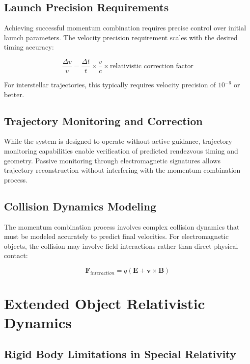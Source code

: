 \documentclass[11pt,a4paper]{article}
\theoremstyle{remark}
\begin{document}
\subsection{Launch Precision Requirements}

Achieving successful momentum combination requires precise control over initial launch parameters. The velocity precision requirement scales with the desired timing accuracy:

\begin{equation}
\frac{\Delta v}{v} = \frac{\Delta t}{t} \times \frac{v}{c} \times \text{relativistic correction factor}
\label{eq:precision_requirement}
\end{equation}

For interstellar trajectories, this typically requires velocity precision of $10^{-6}$ or better.

\subsection{Trajectory Monitoring and Correction}

While the system is designed to operate without active guidance, trajectory monitoring capabilities enable verification of predicted rendezvous timing and geometry. Passive monitoring through electromagnetic signatures allows trajectory reconstruction without interfering with the momentum combination process.

\subsection{Collision Dynamics Modeling}

The momentum combination process involves complex collision dynamics that must be modeled accurately to predict final velocities. For electromagnetic objects, the collision may involve field interactions rather than direct physical contact:

\begin{equation}
\mathbf{F}_{interaction} = q(\mathbf{E} + \mathbf{v} \times \mathbf{B})
\label{eq:electromagnetic_interaction}
\end{equation}

\section{Extended Object Relativistic Dynamics}

\subsection{Rigid Body Limitations in Special Relativity}
\end{document}
